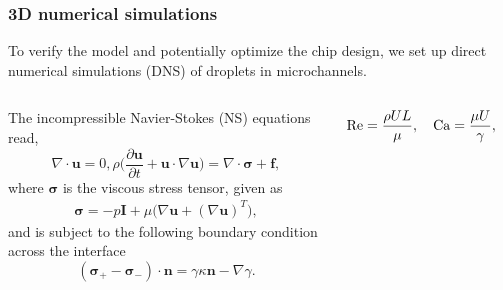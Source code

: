 \begin{frame}
  \frametitle{3D numerical simulations}

  To verify the model and potentially optimize the chip design, we set up direct numerical simulations (DNS) of droplets in microchannels.
  \vskip0.3cm

  \pause
  \begin{columns}[T]

    \begin{column}{0.55\textwidth}
      \begin{bluecolorbox}
        The incompressible Navier-Stokes (NS) equations read,
        \begin{subequations} \label{eq:Navier-Sotkes}
          \begin{equation}
            \nabla \cdot {\bm u} = 0,
            \label{eq:div-free}
          \end{equation}
          \begin{equation}
            \rho \bigg(\frac{\partial {\bm u}}{\partial t} + {\bm u} \cdot \nabla {\bm u} \bigg) = \nabla \cdot {\bm \sigma} + {\bm f},
            \label{eq:NS}
          \end{equation}
        \end{subequations}
        where $\bm \sigma$ is the viscous stress tensor, given as
        \begin{equation}
          \begin{aligned}
            {\bm \sigma} = -p {\bm I}+ \mu \bigg( \nabla {\bm u} + (\nabla {\bm u})^T \bigg),
          \end{aligned}
        \end{equation}
        and is subject to the following boundary condition across the interface
        \begin{equation} \label{eq:stress-bc}
          ({\bm \sigma}_+ - {\bm \sigma}_- ) \cdot {\bm n} = \gamma \kappa {\bm n} - \nabla \gamma.
        \end{equation}
      \end{bluecolorbox}
    \end{column}

    \pause
    \begin{column}{0.4\textwidth}
      \centering
      \begin{bluecolorbox}
        \begin{equation} \notag
          \begin{aligned}
            \textrm{Re} = \frac{\rho UL}{\mu}, \quad
            \textrm{Ca} = \frac{\mu U}{\gamma}, \quad
            \textrm{Fr} = \frac{U^2}{FL}.  
          \end{aligned}
        \end{equation}
      \end{bluecolorbox}
      \vskip0.2cm


\end{column}
\end{columns}
\end{frame}

